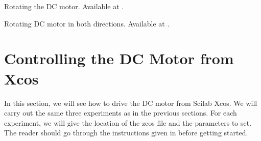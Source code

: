 \begin{scicode}
  {Rotating the DC motor.  Available at
    .}
  \label{sci:dcmotor-clock}
  
\end{scicode}

\begin{scicode}
  {Rotating DC motor in both directions.  Available at
    .}
  \label{sci:dcmotor-both}
  
\end{scicode}

\begin{scicode}
  \label{sci:dcmotor-loop}
  
\end{scicode}

\section{Controlling the DC Motor from Xcos}
In this section, we will see how to drive the DC motor from Scilab Xcos. 
We will carry out the same three experiments as in the previous
sections. For each experiment, we will give the location of the zcos file and the
parameters to set.  The reader should go through the instructions
given in  before getting started.  



